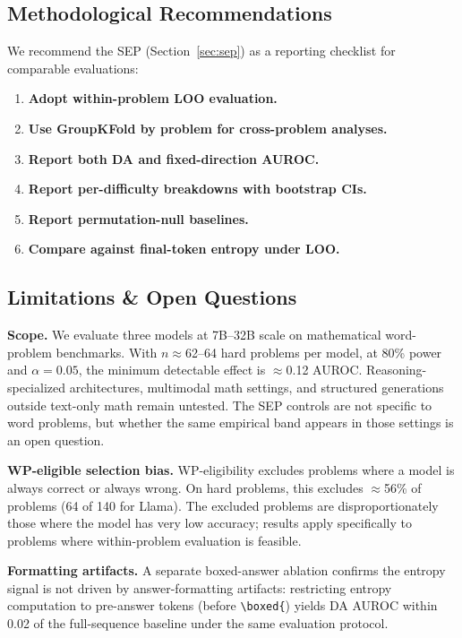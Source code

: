 \documentclass{article}
\begin{document}
\subsection{Methodological Recommendations}

We recommend the SEP (Section~\ref{sec:sep}) as a reporting checklist for comparable evaluations:
\begin{enumerate}
    \item \textbf{Adopt within-problem LOO evaluation.}
    \item \textbf{Use GroupKFold by problem for cross-problem analyses.}
    \item \textbf{Report both DA and fixed-direction AUROC.}
    \item \textbf{Report per-difficulty breakdowns with bootstrap CIs.}
    \item \textbf{Report permutation-null baselines.}
    \item \textbf{Compare against final-token entropy under LOO.}
\end{enumerate}

\subsection{Limitations \& Open Questions}
\label{sec:limitations}

\textbf{Scope.} We evaluate three models at 7B--32B scale on mathematical word-problem benchmarks. With $n \approx$62--64 hard problems per model, at 80\% power and $\alpha{=}0.05$, the minimum detectable effect is $\approx$0.12 AUROC. Reasoning-specialized architectures, multimodal math settings, and structured generations outside text-only math remain untested. The SEP controls are not specific to word problems, but whether the same empirical band appears in those settings is an open question.

\textbf{WP-eligible selection bias.} WP-eligibility excludes problems where a model is always correct or always wrong. On hard problems, this excludes $\approx$56\% of problems (64 of 140 for Llama). The excluded problems are disproportionately those where the model has very low accuracy; results apply specifically to problems where within-problem evaluation is feasible.

\textbf{Formatting artifacts.} A separate boxed-answer ablation confirms the entropy signal is not driven by answer-formatting artifacts: restricting entropy computation to pre-answer tokens (before \texttt{\textbackslash boxed\{}) yields DA AUROC within 0.02 of the full-sequence baseline under the same evaluation protocol.
\end{document}
